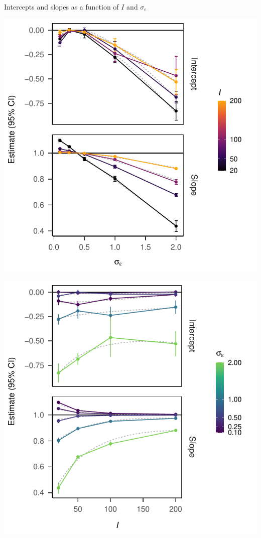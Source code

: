 \documentclass[
  a4paper,
  DIV=11,
  numbers=noendperiod,
  oneside]{scrartcl}
\begin{document}
Intercepts and slopes as a function of \(I\) and \(\sigma_\epsilon\)

\includegraphics{prior_translation_files/figure-pdf/trend-plots-ttest-exploration-1.pdf}

\includegraphics{prior_translation_files/figure-pdf/trend-plots-ttest-exploration-2.pdf}
\end{document}
